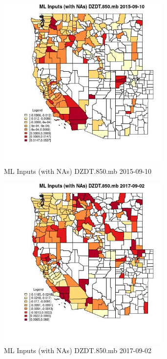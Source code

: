 \begin{figure} 
\centering  
\includegraphics[width=0.77\textwidth]{Code_Outputs/Report_ML_input_PM25_Step4_part_e_de_duplicated_aves_compiled_2019-05-21wNAs_CountyDZDT850mbMean2015-09-10.jpg} 
\caption{\label{fig:Report_ML_input_PM25_Step4_part_e_de_duplicated_aves_compiled_2019-05-21wNAsCountyDZDT850mbMean2015-09-10}ML Inputs (with NAs) DZDT.850.mb 2015-09-10} 
\end{figure} 
 

\begin{figure} 
\centering  
\includegraphics[width=0.77\textwidth]{Code_Outputs/Report_ML_input_PM25_Step4_part_e_de_duplicated_aves_compiled_2019-05-21wNAs_CountyDZDT850mbMean2017-09-02.jpg} 
\caption{\label{fig:Report_ML_input_PM25_Step4_part_e_de_duplicated_aves_compiled_2019-05-21wNAsCountyDZDT850mbMean2017-09-02}ML Inputs (with NAs) DZDT.850.mb 2017-09-02} 
\end{figure} 
 

